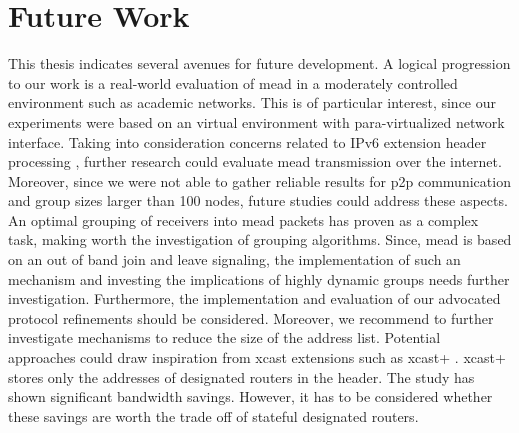 \section{Future Work} %
\label{sec:Further Work}
This thesis indicates several avenues for future development.
A logical progression to our work is a real-world evaluation of \gls{mead} in a
    moderately controlled environment such as academic networks.
This is of particular interest, since our experiments were based on an virtual
    environment with para-virtualized network interface.
Taking into consideration concerns related to IPv6 extension header processing
    \cite{rfc7872_ext_hdrs_drop_rate}, further research could evaluate
    \gls{mead} transmission over the internet.
Moreover, since we were not able to gather reliable results for \gls{p2p}
    communication and group sizes larger than 100 nodes, future studies could
    address these aspects.
An optimal grouping of receivers into \gls{mead} packets has proven as a
    complex task, making worth the investigation of grouping algorithms.
Since, \gls{mead} is based on an out of band join and leave signaling, the
    implementation of such an mechanism and investing the implications of
    highly dynamic groups needs further investigation. 
Furthermore, the implementation and evaluation of our advocated protocol
    refinements should be considered.
Moreover, we recommend to further investigate mechanisms to reduce the size
    of the address list.
Potential approaches could draw inspiration from \gls{xcast} extensions such
    as \gls{xcast+} \cite{xcast+}.
\gls{xcast+} stores only the addresses of designated routers in the header.
The study has shown significant bandwidth savings.
However, it has to be considered whether these savings are worth the trade off
    of stateful designated routers.


